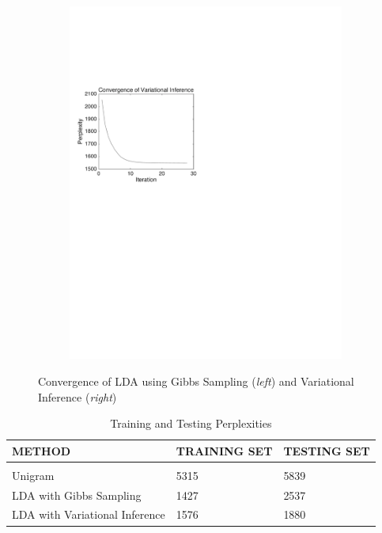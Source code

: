 \documentclass{article} %
\begin{document}
\begin{figure}
\begin{subfigure}{.5\linewidth}
\includegraphics[width=1\textwidth]{AP_topics_10_VI_Perplexity}
\end{subfigure}
\caption{Convergence of LDA using Gibbs Sampling (\textit{left}) and Variational Inference (\textit{right})}\label{fig:convergence}
\end{figure}

\begin{table}[t]
\caption{Training and Testing Perplexities}
\label{pplex_table}
\begin{center}
\begin{tabular}{l l l}
{\bf METHOD}  &{\bf TRAINING SET} & {\bf TESTING SET}\\ 
\hline\\
Unigram          & 5315 & 5839\\
LDA with Gibbs Sampling            & 1427 & 2537\\
LDA with Variational Inference    &  1576 & 1880\\
\end{tabular}
\end{center}
\end{table}
\end{document}
